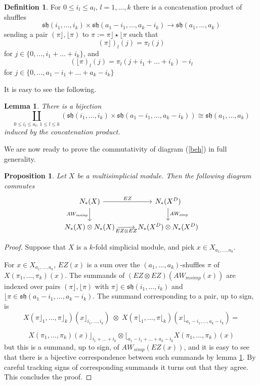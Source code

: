 \documentclass[a4paper,11pt]{article}
\newtheorem{proposition}[theorem]{Proposition}
\newtheorem{lemma}[theorem]{Lemma}
\theoremstyle{remark}
\theoremstyle{definition}
\newtheorem{definition}[theorem]{Definition}
\begin{document}


\begin{definition}
For $0 \leq i_l \leq a_l, \, l=1,\dots,k$ there is a concatenation product of shuffles
$$ \mathfrak{sh}(i_1,\dots ,i_k) \times \mathfrak{sh}(a_1-i_1,\dots,a_k-i_k) \to \mathfrak{sh}(a_1,\dots,a_k)     $$
sending a pair $( \pi \rfloor , \lfloor \pi )$ to $\pi:=\pi \rfloor \star \lfloor \pi$ such that
$$ (\pi \rfloor)_l(j)= \pi_l(j)$$ for $j \in \{0,\dots,i_1+\dots+i_k\}$, and 
$$ (\lfloor \pi)_l (j)= \pi_l(j+i_1+\dots+i_k)-i_l  $$   for $j \in \{0,\dots,a_1-i_1+\dots+a_k-i_k \}$
\end{definition}

It is easy to see the following. 
\begin{lemma}\label{concat}
There is a bijection
$$\coprod_{0 \leq i_l \leq  a_l, \, 1 \leq l \leq k} ( \mathfrak{sh}(i_1,\dots,i_k) \times  \mathfrak{sh}(a_1-i_1,\dots,a_k-i_k) )  \cong 
 \mathfrak{sh}(a_1,\dots,a_k)  $$
 induced by the concatenation product.
\end{lemma}

We are now ready to prove the commutativity of diagram (\ref{beh})  in full generality.
\begin{proposition}
	\label{propcentrale}
Let $X$ be a multisimplicial module. Then the following diagram commutes
	\begin{equation*}
	\begin{tikzcd}
	\label{diagramma}
	N_{*}(X) \arrow[r,"{EZ}"] \arrow[d,"{AW_{\textit{msimp}}}"']
	& N_{*}(X^{D})  \arrow[d, "{AW_{\textit{simp}}}"] \\
	N_{*}(X) \otimes N_{*}(X) \arrow[r,"{EZ\otimes EZ}"']
	& N_{*}(X^{D}) \otimes  N_{*}(X^{D})
	\end{tikzcd}
	\end{equation*}
\end{proposition}
\begin{proof}
Suppose that $X$ is a $k$-fold simplicial module, and pick $x \in X_{a_1,\dots,a_k}$. 



For $x \in X_{a_1,\dots,a_k}$, $EZ(x)$ is a sum over the $(a_1,\dots,a_k)$-shuffles $\pi$ of $X(\pi_1,\dots,\pi_k)(x)$.  
The summands of $(EZ \otimes EZ)(AW_{msimp}(x))$ are indexed over pairs $(\pi \rfloor, \lfloor \pi)$ with
$\pi \rfloor \in \mathfrak{sh}(i_1,\dots,i_k)$ and $\lfloor \pi \in \mathfrak{sh}(a_1-i_1,\dots,a_k-i_k)$.
The summand corresponding to a pair, up to sign, is  $$   X(\pi \rfloor_1,\dots,\pi \rfloor_k)(x \rfloor_{i_1,\dots,i_k}) \;  \otimes \;
X( \pi \lfloor_1,\dots, \pi \lfloor_k)(x \lfloor_{a_1-i_1,\dots,a_k-i_k})=$$

$$        X(\pi_1,\dots,\pi_k) (x)\rfloor_{i_1+\dots+i_k}        \otimes    \lfloor_{a_1-i_1+\dots+a_k-i_k} X(\pi_1,\dots,\pi_k)(x) $$
but this is a summand, up to sign, of $AW_{simp}(EZ(x))$, and it is easy to see that there is a bijective correspondence between such summands by lemma
\ref{concat}.  By careful tracking signs of corresponding summands it turns out that they agree.
This concludes the proof.
\end{proof}
\end{document}
